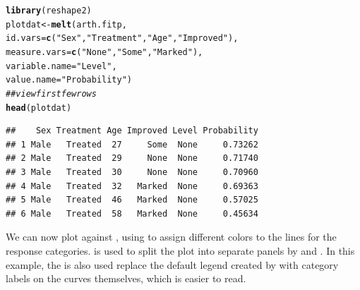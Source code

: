 \documentclass[11pt]{book}\usepackage[]{graphicx}\usepackage[]{color}
\makeatletter
\newcommand{\hlstr}[1]{\textcolor[rgb]{0.192,0.494,0.8}{#1}}%
\newcommand{\hlcom}[1]{\textcolor[rgb]{0.678,0.584,0.686}{\textit{#1}}}%
\newcommand{\hlstd}[1]{\textcolor[rgb]{0.345,0.345,0.345}{#1}}%
\newcommand{\hlkwb}[1]{\textcolor[rgb]{0.69,0.353,0.396}{#1}}%
\newcommand{\hlkwc}[1]{\textcolor[rgb]{0.333,0.667,0.333}{#1}}%
\newcommand{\hlkwd}[1]{\textcolor[rgb]{0.737,0.353,0.396}{\textbf{#1}}}%
\newenvironment{kframe}{%
 \def\at@end@of@kframe{}%
 \ifinner\ifhmode%
  \def\at@end@of@kframe{\end{minipage}}%
  \begin{minipage}{\columnwidth}%
 \fi\fi%
 \def\FrameCommand##1{\hskip\@totalleftmargin \hskip-\fboxsep
 \colorbox{shadecolor}{##1}\hskip-\fboxsep
     \hskip-\linewidth \hskip-\@totalleftmargin \hskip\columnwidth}%
 \MakeFramed {\advance\hsize-\width
   \@totalleftmargin\z@ \linewidth\hsize
   \@setminipage}}%
 {\par\unskip\endMakeFramed%
 \at@end@of@kframe}
\newenvironment{knitrout}{}{} %
\renewenvironment{knitrout}{\small\renewcommand{\baselinestretch}{.85}}{} %
\makeatother
\begin{document}
\begin{knitrout}
\color{fgcolor}\begin{kframe}
\begin{alltt}
\hlkwd{library}\hlstd{(reshape2)}
\hlstd{plotdat} \hlkwb{<-} \hlkwd{melt}\hlstd{(arth.fitp,}
                \hlkwc{id.vars} \hlstd{=} \hlkwd{c}\hlstd{(}\hlstr{"Sex"}\hlstd{,} \hlstr{"Treatment"}\hlstd{,} \hlstr{"Age"}\hlstd{,} \hlstr{"Improved"}\hlstd{),}
                \hlkwc{measure.vars}\hlstd{=}\hlkwd{c}\hlstd{(}\hlstr{"None"}\hlstd{,} \hlstr{"Some"}\hlstd{,} \hlstr{"Marked"}\hlstd{),}
                \hlkwc{variable.name} \hlstd{=} \hlstr{"Level"}\hlstd{,}
                \hlkwc{value.name} \hlstd{=} \hlstr{"Probability"}\hlstd{)}
\hlcom{## view first few rows}
\hlkwd{head}\hlstd{(plotdat)}
\end{alltt}
\begin{verbatim}
##    Sex Treatment Age Improved Level Probability
## 1 Male   Treated  27     Some  None     0.73262
## 2 Male   Treated  29     None  None     0.71740
## 3 Male   Treated  30     None  None     0.70960
## 4 Male   Treated  32   Marked  None     0.69363
## 5 Male   Treated  46   Marked  None     0.57025
## 6 Male   Treated  58   Marked  None     0.45634
\end{verbatim}
\end{kframe}
\end{knitrout}
We can now plot  against , using  to assign
different colors to the lines for the response categories.  
is used to split the plot into separate panels by  and .
In this example, the  is also used replace the default
legend created by  with category labels on the curves themselves,
which is easier to read.
\end{document}
